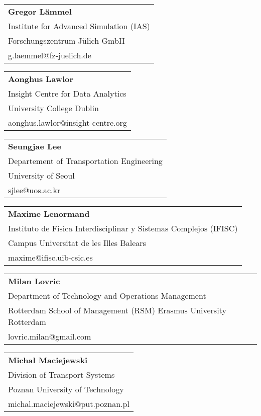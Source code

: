 \begin{tabular}[width=0.48\textwidth]{@{}l}
\textbf{Gregor Lämmel} \\
Institute for Advanced Simulation (IAS) \\
Forschungszentrum Jülich GmbH \\
g.laemmel@fz-juelich.de \\
\end{tabular}

\begin{tabular}[width=0.48\textwidth]{@{}l}
\textbf{Aonghus Lawlor} \\
Insight Centre for Data Analytics \\
University College Dublin \\
aonghus.lawlor@insight-centre.org \\
\end{tabular}

\begin{tabular}[width=0.48\textwidth]{@{}l}
\textbf{Seungjae Lee} \\
Departement of Transportation Engineering \\
University of Seoul \\
sjlee@uos.ac.kr \\
\end{tabular}

\begin{tabular}[width=0.48\textwidth]{@{}l}
\textbf{Maxime Lenormand} \\
Instituto de Fisica Interdisciplinar y Sistemas Complejos (IFISC) \\
Campus Universitat de les Illes Balears \\
maxime@ifisc.uib-csic.es   \\
\end{tabular}

\begin{tabular}[width=0.48\textwidth]{@{}l}
\textbf{Milan Lovric} \\
Department of Technology and Operations Management \\
Rotterdam School of Management (RSM) Erasmus University Rotterdam \\
lovric.milan@gmail.com  \\
\end{tabular}

\begin{tabular}[width=0.48\textwidth]{@{}l}
\textbf{Michal Maciejewski} \\
Division of Transport Systems \\
Poznan University of Technology \\
michal.maciejewski@put.poznan.pl \\
\end{tabular}

